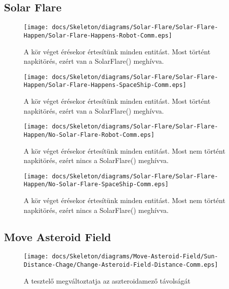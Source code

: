 \subsection{Solar Flare}

\begin{figure}[H] 
    \centering 
    \texttt{[image: docs/Skeleton/diagrams/Solar-Flare/Solar-Flare-Happen/Solar-Flare-Happens-Robot-Comm.eps]} 
    \caption{A kör véget érésekor értesítünk minden entitást. Most történt napkitörés, ezért van a SolarFlare() meghívva.} 
\end{figure}

\begin{figure}[H] 
    \centering 
    \texttt{[image: docs/Skeleton/diagrams/Solar-Flare/Solar-Flare-Happen/Solar-Flare-Happens-SpaceShip-Comm.eps]} 
    \caption{A kör véget érésekor értesítünk minden entitást. Most történt napkitörés, ezért van a SolarFlare() meghívva.} 
\end{figure} 

\begin{figure}[H] 
    \centering 
    \texttt{[image: docs/Skeleton/diagrams/Solar-Flare/Solar-Flare-Happen/No-Solar-Flare-Robot-Comm.eps]} 
    \caption{A kör véget érésekor értesítünk minden entitást. Most nem történt napkitörés, ezért nincs a SolarFlare() meghívva.} 
\end{figure}

\begin{figure}[H] 
    \centering 
    \texttt{[image: docs/Skeleton/diagrams/Solar-Flare/Solar-Flare-Happen/No-Solar-Flare-SpaceShip-Comm.eps]} 
    \caption{A kör véget érésekor értesítünk minden entitást. Most nem történt napkitörés, ezért nincs a SolarFlare() meghívva.} 
\end{figure}


\subsection{Move Asteroid Field}

\begin{figure}[H] 
    \centering 
    \texttt{[image: docs/Skeleton/diagrams/Move-Asteroid-Field/Sun-Distance-Chage/Change-Asteroid-Field-Distance-Comm.eps]} 
    \caption{A tesztelő megváltoztatja az aszteroidamező távolságát} 
\end{figure}